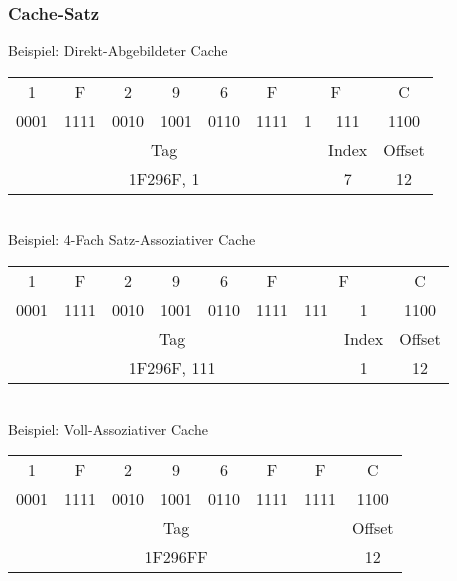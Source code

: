 \documentclass[xcolor=pdftex,dvipsnames,table]{beamer}
\begin{document}
\begin{frame}
	\frametitle{Cache-Satz}
	Beispiel: Direkt-Abgebildeter Cache
	\begin{tabular}{|c|c|c|c|c|c|cc|c|}
		\hline
		1 & F & 2 & 9 & 6 & F & \multicolumn{2}{c|}{F} & C \\
		0001 & 1111 & 0010 & 1001 & 0110 & 1111 & 1 & 111 & 1100\\
		\hline
		\multicolumn{7}{|c|}{Tag} &
		 Index &
		
		Offset \\
		\multicolumn{7}{|c|}{1F296F, 1} &
		7 &
		
		12 \\
		\hline
	\end{tabular}


	\ \\
	Beispiel: 4-Fach Satz-Assoziativer Cache
	\begin{tabular}{|c|c|c|c|c|c|cc|c|}
		\hline
		1 & F & 2 & 9 & 6 & F & \multicolumn{2}{c|}{F} & C \\
		0001 & 1111 & 0010 & 1001 & 0110 & 1111 & 111 & 1 & 1100\\
		\hline
		\multicolumn{7}{|c|}{Tag} &
		Index &
		
		Offset \\
		\multicolumn{7}{|c|}{1F296F, 111} &
		1 &
		
		12 \\
		\hline
	\end{tabular}
	
	\ \\	
	Beispiel: Voll-Assoziativer Cache
	\begin{tabular}{|c|c|c|c|c|c|c|c|}
	\hline
	1 & F & 2 & 9 & 6 & F & F & C \\
	0001 & 1111 & 0010 & 1001 & 0110 & 1111 & 1111 & 1100\\
	\hline
	\multicolumn{7}{|c|}{Tag} &
		
	Offset \\
	\multicolumn{7}{|c|}{1F296FF} &
	
	12 \\
	\hline
\end{tabular}
\end{frame}
\end{document}
